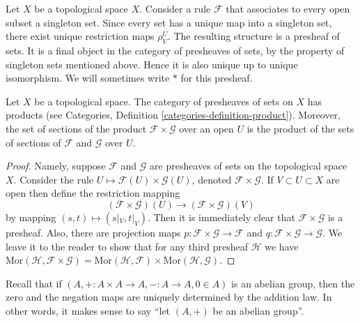 \begin{example}
\label{example-singleton-presheaf}
Let $X$ be a topological space $X$. Consider a rule $\mathcal{F}$ that
associates to every open subset a singleton set. Since every set
has a unique map into a singleton set, there exist unique restriction
maps $\rho^U_V$. The resulting structure is a presheaf of sets.
It is a final object in the category of presheaves of sets, by the
property of singleton sets mentioned above. Hence it is
also unique up to unique isomorphism. We will sometimes write $*$
for this presheaf.
\end{example}

\begin{lemma}
\label{lemma-product-presheaves}
Let $X$ be a topological space. The category of presheaves of sets
on $X$ has products (see
Categories, Definition \ref{categories-definition-product}).
Moreover, the set of
sections of the product $\mathcal{F} \times \mathcal{G}$
over an open $U$ is the product of the sets of sections of
$\mathcal{F}$ and $\mathcal{G}$ over $U$.
\end{lemma}

\begin{proof}
Namely, suppose $\mathcal{F}$ and $\mathcal{G}$ are
presheaves of sets on the topological space $X$.
Consider the rule $U \mapsto \mathcal{F}(U) \times \mathcal{G}(U)$,
denoted $\mathcal{F}\times \mathcal{G}$. If $V \subset U \subset X$
are open then define the restriction mapping
$$
(\mathcal{F} \times \mathcal{G})(U)
\longrightarrow
(\mathcal{F} \times \mathcal{G})(V)
$$
by mapping $(s, t) \mapsto (s|_V, t|_V)$. Then it is immediately
clear that $\mathcal{F}\times\mathcal{G}$ is a presheaf.
Also, there are projection maps
$p : \mathcal{F}\times\mathcal{G} \to \mathcal{F}$
and 
$q : \mathcal{F}\times\mathcal{G} \to \mathcal{G}$.
We leave it to the reader to show that
for any third presheaf $\mathcal{H}$ we have
$\text{Mor}(\mathcal{H}, \mathcal{F}\times \mathcal{G})
= \text{Mor}(\mathcal{H}, \mathcal{F}) \times
\text{Mor}(\mathcal{H}, \mathcal{G})$.
\end{proof}

\noindent
Recall that if $(A, + : A\times A \to A, - : A \to A, 0\in A)$
is an abelian group, then the zero and the negation maps are
uniquely determined by the addition law. In other words, it
makes sense to say ``let $(A, +)$ be an abelian group''.

